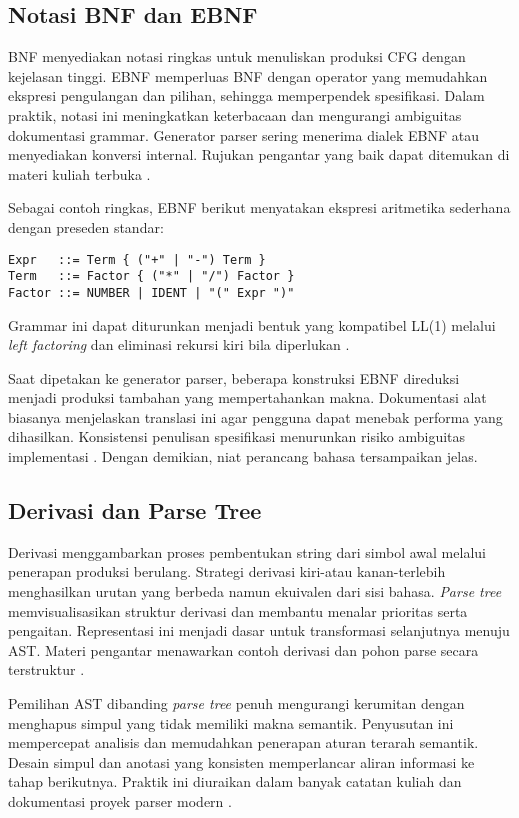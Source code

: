\documentclass[../main.tex]{subfiles}
\begin{document}
\subsection{Notasi BNF dan EBNF}
BNF menyediakan notasi ringkas untuk menuliskan produksi CFG dengan kejelasan tinggi. EBNF memperluas BNF dengan operator yang memudahkan ekspresi pengulangan dan pilihan, sehingga memperpendek spesifikasi. Dalam praktik, notasi ini meningkatkan keterbacaan dan mengurangi ambiguitas dokumentasi grammar. Generator parser sering menerima dialek EBNF atau menyediakan konversi internal. Rujukan pengantar yang baik dapat ditemukan di materi kuliah terbuka \citep{CS143}.

Sebagai contoh ringkas, EBNF berikut menyatakan ekspresi aritmetika sederhana dengan preseden standar:
\begin{verbatim}
Expr   ::= Term { ("+" | "-") Term }
Term   ::= Factor { ("*" | "/") Factor }
Factor ::= NUMBER | IDENT | "(" Expr ")"
\end{verbatim}
Grammar ini dapat diturunkan menjadi bentuk yang kompatibel LL(1) melalui \emph{left factoring} dan eliminasi rekursi kiri bila diperlukan \citep{WikiLL}.

Saat dipetakan ke generator parser, beberapa konstruksi EBNF direduksi menjadi produksi tambahan yang mempertahankan makna. Dokumentasi alat biasanya menjelaskan translasi ini agar pengguna dapat menebak performa yang dihasilkan. Konsistensi penulisan spesifikasi menurunkan risiko ambiguitas implementasi \citep{CS143}. Dengan demikian, niat perancang bahasa tersampaikan jelas.

\subsection{Derivasi dan Parse Tree}
Derivasi menggambarkan proses pembentukan string dari simbol awal melalui penerapan produksi berulang. Strategi derivasi kiri-atau kanan-terlebih menghasilkan urutan yang berbeda namun ekuivalen dari sisi bahasa. \emph{Parse tree} memvisualisasikan struktur derivasi dan membantu menalar prioritas serta pengaitan. Representasi ini menjadi dasar untuk transformasi selanjutnya menuju AST. Materi pengantar menawarkan contoh derivasi dan pohon parse secara terstruktur \citep{CS143}.

Pemilihan AST dibanding \emph{parse tree} penuh mengurangi kerumitan dengan menghapus simpul yang tidak memiliki makna semantik. Penyusutan ini mempercepat analisis dan memudahkan penerapan aturan terarah semantik. Desain simpul dan anotasi yang konsisten memperlancar aliran informasi ke tahap berikutnya. Praktik ini diuraikan dalam banyak catatan kuliah dan dokumentasi proyek parser modern \citep{WikiAST,ANTLRDocs}.
\end{document}
